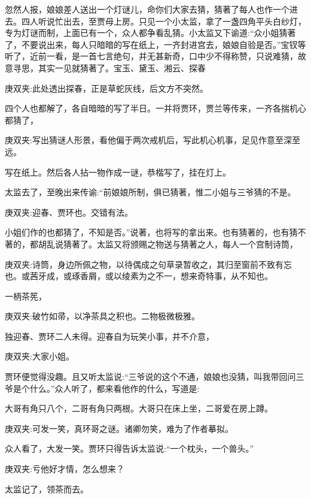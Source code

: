 \begin{parag}
    忽然人报，娘娘差人送出一个灯谜儿，命你们大家去猜，猜著了每人也作一个进去。四人听说忙出去，至贾母上房。只见一个小太监，拿了一盏四角平头白纱灯，专为灯谜而制，上面已有一个，众人都争看乱猜。小太监又下谕道:“众小姐猜著了，不要说出来，每人只暗暗的写在纸上，一齐封进宫去，娘娘自验是否。”宝钗等听了，近前一看，是一首七言绝句，并无甚新奇，口中少不得称赞，只说难猜，故意寻思，其实一见就猜著了。宝玉、黛玉、湘云、探春\begin{note}庚双夹:此处透出探春，正是草蛇灰线，后文方不突然。\end{note}四个人也都解了，各自暗暗的写了半日。一并将贾环，贾兰等传来，一齐各揣机心都猜了，\begin{note}庚双夹:写出猜谜人形景，看他偏于两次戒机后，写此机心机事，足见作意至深至远。\end{note}写在纸上。然后各人拈一物作成一谜，恭楷写了，挂在灯上。
\end{parag}


\begin{parag}
    太监去了，至晚出来传谕:“前娘娘所制，俱已猜著，惟二小姐与三爷猜的不是。\begin{note}庚双夹:迎春、贾环也。交错有法。\end{note}小姐们作的也都猜了，不知是否。”说著，也将写的拿出来。也有猜著的，也有猜不著的，都胡乱说猜著了。太监又将颁赐之物送与猜著之人，每人一个宫制诗筒，\begin{note}庚双夹:诗筒，身边所佩之物，以待偶成之句草录暂收之，其归至窗前不致有忘也。或茜牙成，或琢香屑，或以绫素为之不一，想来奇特事，从不知也。\end{note}一柄茶筅，\begin{note}庚双夹:破竹如帚，以净茶具之积也。二物极微极雅。\end{note}独迎春、贾环二人未得。迎春自为玩笑小事，并不介意，\begin{note}庚双夹:大家小姐。\end{note}贾环便觉得没趣。且又听太监说:“三爷说的这个不通，娘娘也没猜，叫我带回问三爷是个什么。”众人听了，都来看他作的什么，写道是:
\end{parag}


\begin{parag}
    大哥有角只八个，二哥有角只两根。大哥只在床上坐，二哥爱在房上蹲。\begin{note}庚双夹:可发一笑，真环哥之谜。诸卿勿笑，难为了作者摹拟。\end{note}
\end{parag}


\begin{parag}
    众人看了，大发一笑。贾环只得告诉太监说:“一个枕头，一个兽头。”\begin{note}庚双夹:亏他好才情，怎么想来？\end{note}太监记了，领茶而去。
\end{parag}


